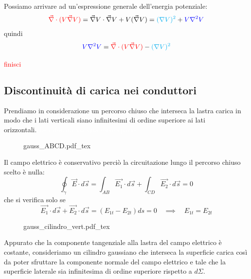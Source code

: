 \documentclass[x11names]{report}
\newcommand{\incfig}[1]{%
	{#1.pdf_tex}
}
\begin{document}
Possiamo arrivare ad un'espressione generale dell'energia potenziale:
\[
\textcolor{red}{\vec{\nabla}\cdot (V\vec{\nabla}V)} = \vec{\nabla}V\cdot \vec{\nabla}V + V(\vec{\nabla}V) = \textcolor{cyan}{(\nabla V)^2} + \textcolor{blue}{V\nabla ^2V}
\]
quindi
\[
\textcolor{blue}{V\nabla ^2V} = \textcolor{red}{\vec{\nabla}\cdot (V\vec{\nabla}V)} - \textcolor{cyan}{(\nabla V)^2}
\]
\begin{center}
	\textcolor{red}{finisci}
\end{center}
\subsection{Discontinuità di carica nei conduttori}
Prendiamo in considerazione un percorso chiuso che interseca la lastra carica in modo che i lati verticali siano infinitesimi di ordine superiore ai lati orizzontali.\textcolor{white}{che cafonata ma qua serve spazio}
\begin{figure}
	\hspace{1cm}
	\incfig{gauss_ABCD}
\end{figure}

Il campo elettrico è conservativo perciò la circuitazione lungo il percorso chiuso scelto è nulla:
\[
\oint_\gamma \vec{E}\cdot d\vec{s} = \int_{AB} \vec{E_1}\cdot d\vec{s} + \int_{CD}  \vec{E_2}\cdot  d\vec{s} = 0
\]
che si verifica solo se
\[
\vec{E_1}\cdot  d\vec{s} + \vec{E_2}\cdot  d\vec{s} =( E_{1t}  - E_{2t})ds = 0 \quad \implies \quad  E_{1t} = E_{2t}
\]
\begin{figure}
	\incfig{gauss_cilindro_vert}
\end{figure}
Appurato che la componente tangenziale alla lastra del campo elettrico è costante, consideriamo un cilindro gaussiano che interseca la superficie carica così da poter sfruttare la componente normale del campo elettrico e tale che la superficie laterale sia infinitesima di ordine superiore rispetto a \(d\Sigma\). \\
\end{document}
